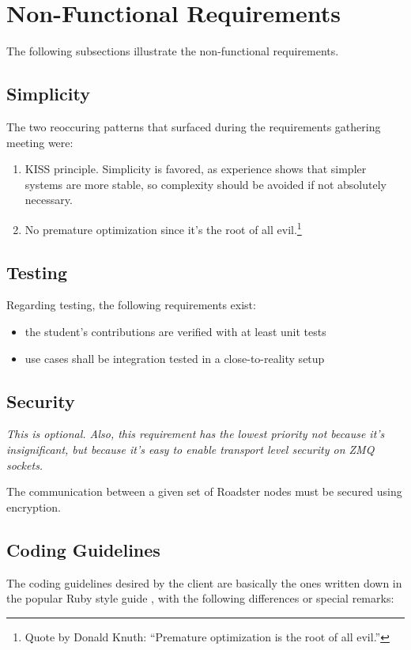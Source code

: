 \section{Non-Functional Requirements}
The following subsections illustrate the non-functional requirements.

\subsection{Simplicity}
The two reoccuring patterns that surfaced during the requirements gathering
meeting were:

\begin{enumerate}
\item \gls{KISS} principle. Simplicity is favored, as experience shows that
	simpler systems are more stable, so complexity should be avoided if not
	absolutely necessary.

\item No premature optimization since it's the root of all evil.\footnote{Quote
	by Donald Knuth: ``Premature optimization is the root of all evil.''}
\end{enumerate}


\subsection{Testing}
Regarding testing, the following requirements exist:
\begin{itemize}
	\item the student's contributions are verified with at least unit tests
	\item use cases shall be integration tested in a close-to-reality setup
\end{itemize}

\subsection{Security}
\emph{This is optional. Also, this requirement has the lowest priority not
because it's insignificant, but because it's easy to enable transport level
security on ZMQ sockets.}

The communication between a given set of Roadster nodes must be secured using
encryption.


\subsection{Coding Guidelines}
The coding guidelines desired by the client are basically the ones written down
in the popular Ruby style guide \cite{rb:style-guide}, with the following
differences or special remarks:

